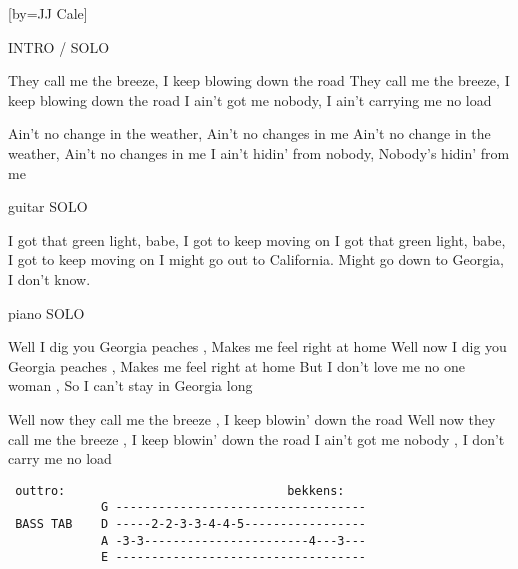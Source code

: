  

[by=JJ Cale]


\beginchorus
INTRO / SOLO
\endchorus

\beginverse
They call me the breeze, \brk  I keep blowing down the road
They call me the breeze, \brk  I keep blowing down the road
I ain't got me nobody, \brk  I ain't carrying me no load
\endverse

\beginverse
Ain't no change in the weather, \brk  Ain't no changes in me
Ain't no change in the weather, \brk  Ain't no changes in me
I ain't hidin' from nobody, \brk  Nobody's hidin' from me
\endverse

\beginchorus
guitar SOLO
\endchorus

\beginverse
I got that green light, babe, \brk  I got to keep moving on
I got that green light, babe, \brk  I got to keep moving on
I might go out to California.
Might go down to Georgia, I don't know.
\endverse

\beginchorus
piano SOLO
\endchorus


\beginverse
Well I dig you Georgia peaches , \brk  Makes me feel right at home 
Well now I dig you Georgia peaches , \brk  Makes me feel right at home 
But I don't love me no one woman , \brk  So I can't stay in Georgia long
\endverse

\beginverse
Well now they call me the breeze , \brk  I keep blowin' down the road 
Well now they call me the breeze , \brk  I keep blowin' down the road 
I ain't got me nobody , \brk  I don't carry me no load 
\endverse

\beginchorus
\chordsoff
\begin{verbatim}
 outtro:                               bekkens: 
             G -----------------------------------
 BASS TAB    D -----2-2-3-3-4-4-5-----------------
             A -3-3-----------------------4---3---
             E -----------------------------------
\end{verbatim}
\endchorus

\endsong
